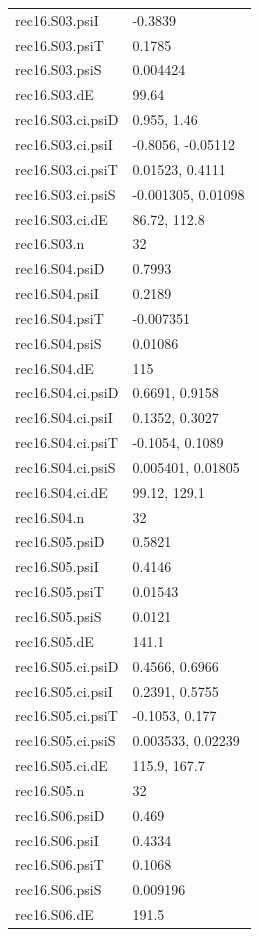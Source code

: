 {\begin{longtable}{p{}p{}}
{}rec16.S03.psiI & -0.3839\\
{}rec16.S03.psiT & 0.1785\\
{}rec16.S03.psiS & 0.004424\\
{}rec16.S03.dE & 99.64\\
{}rec16.S03.ci.psiD & 0.955, 1.46\\
{}rec16.S03.ci.psiI & -0.8056, -0.05112\\
{}rec16.S03.ci.psiT & 0.01523, 0.4111\\
{}rec16.S03.ci.psiS & -0.001305, 0.01098\\
{}rec16.S03.ci.dE & 86.72, 112.8\\
{}rec16.S03.n & 32\\
{}rec16.S04.psiD & 0.7993\\
{}rec16.S04.psiI & 0.2189\\
{}rec16.S04.psiT & -0.007351\\
{}rec16.S04.psiS & 0.01086\\
{}rec16.S04.dE & 115\\
{}rec16.S04.ci.psiD & 0.6691, 0.9158\\
{}rec16.S04.ci.psiI & 0.1352, 0.3027\\
{}rec16.S04.ci.psiT & -0.1054, 0.1089\\
{}rec16.S04.ci.psiS & 0.005401, 0.01805\\
{}rec16.S04.ci.dE & 99.12, 129.1\\
{}rec16.S04.n & 32\\
{}rec16.S05.psiD & 0.5821\\
{}rec16.S05.psiI & 0.4146\\
{}rec16.S05.psiT & 0.01543\\
{}rec16.S05.psiS & 0.0121\\
{}rec16.S05.dE & 141.1\\
{}rec16.S05.ci.psiD & 0.4566, 0.6966\\
{}rec16.S05.ci.psiI & 0.2391, 0.5755\\
{}rec16.S05.ci.psiT & -0.1053, 0.177\\
{}rec16.S05.ci.psiS & 0.003533, 0.02239\\
{}rec16.S05.ci.dE & 115.9, 167.7\\
{}rec16.S05.n & 32\\
{}rec16.S06.psiD & 0.469\\
{}rec16.S06.psiI & 0.4334\\
{}rec16.S06.psiT & 0.1068\\
{}rec16.S06.psiS & 0.009196\\
{}rec16.S06.dE & 191.5\\

\end{longtable}}
